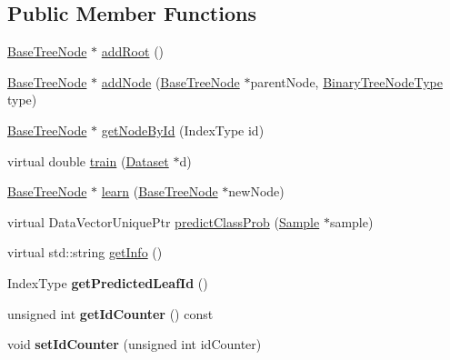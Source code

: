 \subsection*{Public Member Functions}
\begin{DoxyCompactItemize}
\item 
\hyperlink{classffactory_1_1_base_tree_node}{Base\-Tree\-Node} $\ast$ \hyperlink{classffactory_1_1_base_tree_a28a8e1d4cf9733ea57af59083d7ee354}{add\-Root} ()
\item 
\hyperlink{classffactory_1_1_base_tree_node}{Base\-Tree\-Node} $\ast$ \hyperlink{classffactory_1_1_base_tree_a3ca64e97f88521e39a706aac4493257f}{add\-Node} (\hyperlink{classffactory_1_1_base_tree_node}{Base\-Tree\-Node} $\ast$parent\-Node, \hyperlink{namespaceffactory_a405b9095f0a093ae4770f7638f0eb730}{Binary\-Tree\-Node\-Type} type)
\item 
\hyperlink{classffactory_1_1_base_tree_node}{Base\-Tree\-Node} $\ast$ \hyperlink{classffactory_1_1_base_tree_ad2921574143761edc31911d530556700}{get\-Node\-By\-Id} (Index\-Type id)
\item 
virtual double \hyperlink{classffactory_1_1_base_tree_ad93e4fb475d3159a378b5148b127a58a}{train} (\hyperlink{classffactory_1_1_dataset}{Dataset} $\ast$d)
\item 
\hyperlink{classffactory_1_1_base_tree_node}{Base\-Tree\-Node} $\ast$ \hyperlink{classffactory_1_1_base_tree_a1ace4078f8e6ac07ef00303a0abde23a}{learn} (\hyperlink{classffactory_1_1_base_tree_node}{Base\-Tree\-Node} $\ast$new\-Node)
\item 
virtual Data\-Vector\-Unique\-Ptr \hyperlink{classffactory_1_1_base_tree_a962907c4083f23175550bf82059d35f0}{predict\-Class\-Prob} (\hyperlink{classffactory_1_1_sample}{Sample} $\ast$sample)
\item 
virtual std\-::string \hyperlink{classffactory_1_1_base_tree_a21d7faa1c68bb531522a73c36b10a95c}{get\-Info} ()
\item 
\hypertarget{classffactory_1_1_base_tree_a7159c76721ce11ed8f0e05d57cd19650}{Index\-Type {\bfseries get\-Predicted\-Leaf\-Id} ()}\label{classffactory_1_1_base_tree_a7159c76721ce11ed8f0e05d57cd19650}

\item 
\hypertarget{classffactory_1_1_base_tree_a05887de99f2723512d200f95a9517662}{unsigned int {\bfseries get\-Id\-Counter} () const }\label{classffactory_1_1_base_tree_a05887de99f2723512d200f95a9517662}

\item 
\hypertarget{classffactory_1_1_base_tree_a32b114258f2a338748626a0dfdfa3769}{void {\bfseries set\-Id\-Counter} (unsigned int id\-Counter)}\label{classffactory_1_1_base_tree_a32b114258f2a338748626a0dfdfa3769}


\end{DoxyCompactItemize}
